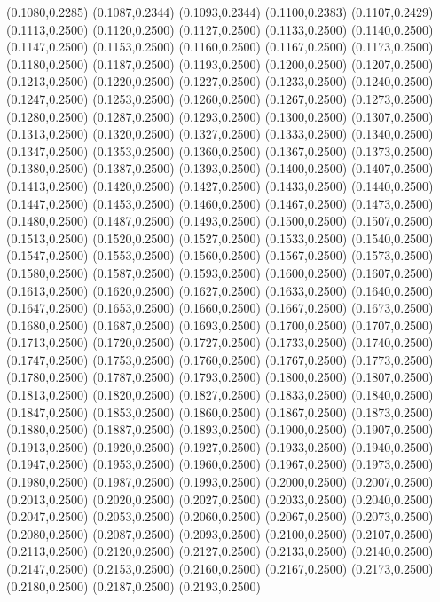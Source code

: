 {(0.1080,0.2285) (0.1087,0.2344) (0.1093,0.2344) (0.1100,0.2383) (0.1107,0.2429) (0.1113,0.2500)
(0.1120,0.2500) (0.1127,0.2500) (0.1133,0.2500) (0.1140,0.2500) (0.1147,0.2500) (0.1153,0.2500)
(0.1160,0.2500) (0.1167,0.2500) (0.1173,0.2500) (0.1180,0.2500) (0.1187,0.2500) (0.1193,0.2500)
(0.1200,0.2500) (0.1207,0.2500) (0.1213,0.2500) (0.1220,0.2500) (0.1227,0.2500) (0.1233,0.2500)
(0.1240,0.2500) (0.1247,0.2500) (0.1253,0.2500) (0.1260,0.2500) (0.1267,0.2500) (0.1273,0.2500)
(0.1280,0.2500) (0.1287,0.2500) (0.1293,0.2500) (0.1300,0.2500) (0.1307,0.2500) (0.1313,0.2500)
(0.1320,0.2500) (0.1327,0.2500) (0.1333,0.2500) (0.1340,0.2500) (0.1347,0.2500) (0.1353,0.2500)
(0.1360,0.2500) (0.1367,0.2500) (0.1373,0.2500) (0.1380,0.2500) (0.1387,0.2500) (0.1393,0.2500)
(0.1400,0.2500) (0.1407,0.2500) (0.1413,0.2500) (0.1420,0.2500) (0.1427,0.2500) (0.1433,0.2500)
(0.1440,0.2500) (0.1447,0.2500) (0.1453,0.2500) (0.1460,0.2500) (0.1467,0.2500) (0.1473,0.2500)
(0.1480,0.2500) (0.1487,0.2500) (0.1493,0.2500) (0.1500,0.2500) (0.1507,0.2500) (0.1513,0.2500)
(0.1520,0.2500) (0.1527,0.2500) (0.1533,0.2500) (0.1540,0.2500) (0.1547,0.2500) (0.1553,0.2500)
(0.1560,0.2500) (0.1567,0.2500) (0.1573,0.2500) (0.1580,0.2500) (0.1587,0.2500) (0.1593,0.2500)
(0.1600,0.2500) (0.1607,0.2500) (0.1613,0.2500) (0.1620,0.2500) (0.1627,0.2500) (0.1633,0.2500)
(0.1640,0.2500) (0.1647,0.2500) (0.1653,0.2500) (0.1660,0.2500) (0.1667,0.2500) (0.1673,0.2500)
(0.1680,0.2500) (0.1687,0.2500) (0.1693,0.2500) (0.1700,0.2500) (0.1707,0.2500) (0.1713,0.2500)
(0.1720,0.2500) (0.1727,0.2500) (0.1733,0.2500) (0.1740,0.2500) (0.1747,0.2500) (0.1753,0.2500)
(0.1760,0.2500) (0.1767,0.2500) (0.1773,0.2500) (0.1780,0.2500) (0.1787,0.2500) (0.1793,0.2500)
(0.1800,0.2500) (0.1807,0.2500) (0.1813,0.2500) (0.1820,0.2500) (0.1827,0.2500) (0.1833,0.2500)
(0.1840,0.2500) (0.1847,0.2500) (0.1853,0.2500) (0.1860,0.2500) (0.1867,0.2500) (0.1873,0.2500)
(0.1880,0.2500) (0.1887,0.2500) (0.1893,0.2500) (0.1900,0.2500) (0.1907,0.2500) (0.1913,0.2500)
(0.1920,0.2500) (0.1927,0.2500) (0.1933,0.2500) (0.1940,0.2500) (0.1947,0.2500) (0.1953,0.2500)
(0.1960,0.2500) (0.1967,0.2500) (0.1973,0.2500) (0.1980,0.2500) (0.1987,0.2500) (0.1993,0.2500)
(0.2000,0.2500) (0.2007,0.2500) (0.2013,0.2500) (0.2020,0.2500) (0.2027,0.2500) (0.2033,0.2500)
(0.2040,0.2500) (0.2047,0.2500) (0.2053,0.2500) (0.2060,0.2500) (0.2067,0.2500) (0.2073,0.2500)
(0.2080,0.2500) (0.2087,0.2500) (0.2093,0.2500) (0.2100,0.2500) (0.2107,0.2500) (0.2113,0.2500)
(0.2120,0.2500) (0.2127,0.2500) (0.2133,0.2500) (0.2140,0.2500) (0.2147,0.2500) (0.2153,0.2500)
(0.2160,0.2500) (0.2167,0.2500) (0.2173,0.2500) (0.2180,0.2500) (0.2187,0.2500) (0.2193,0.2500)
}
